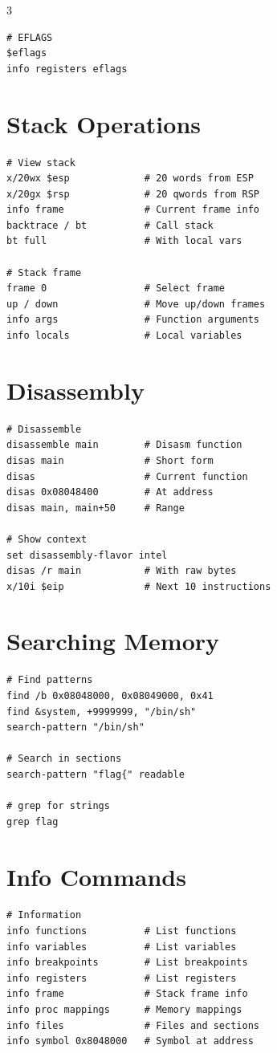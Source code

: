 \documentclass[10pt,landscape,a4paper]{article}
\begin{document}
\begin{multicols}{3}
\begin{lstlisting}
# EFLAGS
$eflags
info registers eflags
\end{lstlisting}

\section*{Stack Operations}
\begin{lstlisting}
# View stack
x/20wx $esp             # 20 words from ESP
x/20gx $rsp             # 20 qwords from RSP
info frame              # Current frame info
backtrace / bt          # Call stack
bt full                 # With local vars

# Stack frame
frame 0                 # Select frame
up / down               # Move up/down frames
info args               # Function arguments
info locals             # Local variables
\end{lstlisting}

\section*{Disassembly}
\begin{lstlisting}
# Disassemble
disassemble main        # Disasm function
disas main              # Short form
disas                   # Current function
disas 0x08048400        # At address
disas main, main+50     # Range

# Show context
set disassembly-flavor intel
disas /r main           # With raw bytes
x/10i $eip              # Next 10 instructions
\end{lstlisting}

\section*{Searching Memory}
\begin{lstlisting}
# Find patterns
find /b 0x08048000, 0x08049000, 0x41
find &system, +9999999, "/bin/sh"
search-pattern "/bin/sh"

# Search in sections
search-pattern "flag{" readable

# grep for strings
grep flag
\end{lstlisting}

\section*{Info Commands}
\begin{lstlisting}
# Information
info functions          # List functions
info variables          # List variables
info breakpoints        # List breakpoints
info registers          # List registers
info frame              # Stack frame info
info proc mappings      # Memory mappings
info files              # Files and sections
info symbol 0x8048000   # Symbol at address


\end{lstlisting}
\end{multicols}
\end{document}
